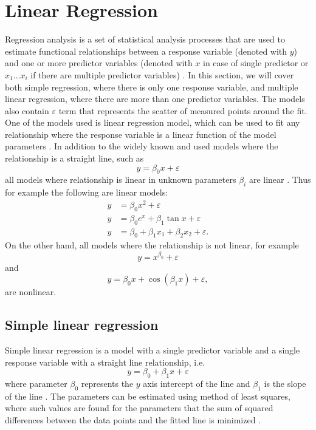 \documentclass[english, oneside]{HYgradu}
\begin{document}
\section{Linear Regression}
Regression analysis is a set of statistical analysis processes that are used to estimate functional relationships between a response variable (denoted with $y$) and one or more predictor variables (denoted with $x$ in case of single predictor or $x_1 \dots x_i$ if there are multiple predictor variables) \citep{feigelson2012modern}. In this section, we will cover both simple regression, where there is only one response variable, and multiple linear regression, where there are more than one predictor variables. The models also contain $\varepsilon$ term that represents the scatter of measured points around the fit. One of the models used is linear regression model, which can be used to fit any relationship where the response variable is a linear function of the model parameters \citep{montgomery2012introduction}. In addition to the widely known and used models where the relationship is a straight line, such as
\begin{equation}
	y = \beta_0 x + \varepsilon
\end{equation}
all models where relationship is linear in unknown parameters $\beta_i$ are linear \citep{montgomery2012introduction}. Thus for example the following are linear models:
\begin{align}
	y &= \beta_0 x^2 + \varepsilon \\
	y &= \beta_0 e^x + \beta_1 \tan{x} + \varepsilon \\
	y &= \beta_0 + \beta_1 x_1 + \beta_2 x_2 + \varepsilon.
\end{align}
On the other hand, all models where the relationship is not linear, for example
\begin{equation}
	y = x^{\beta_0}+ \varepsilon
\end{equation}
and
\begin{equation}
	y = \beta_0 x + \cos{(\beta_1 x)} + \varepsilon,
\end{equation}
are nonlinear.


\subsection{Simple linear regression}\label{sect:simple-linear}
Simple linear regression is a model with a single predictor variable and a single response variable with a straight line relationship, i.e.
\begin{equation}
	y = \beta_0 + \beta_1 x + \varepsilon
\end{equation}
where parameter $\beta_0$ represents the $y$ axis intercept of the line and $\beta_1$ is the slope of the line \citep{montgomery2012introduction}. The parameters can be estimated using method of least squares, where such values are found for the parameters that the sum of squared differences between the data points and the fitted line is minimized \citep{montgomery2012introduction}. 
\end{document}
